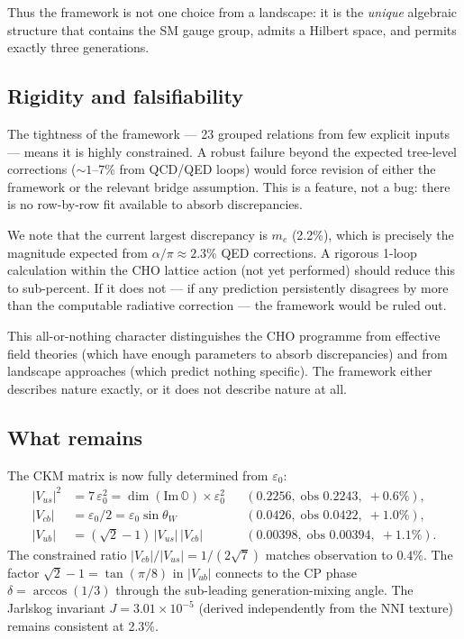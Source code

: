 \documentclass[12pt,a4paper]{article}
\theoremstyle{definition}
\theoremstyle{remark}
\newcommand{\Oct}{\mathbb{O}}
\begin{document}
Thus the framework is not one choice from a landscape: it is the \emph{unique} 
algebraic structure that contains the SM gauge group, admits a Hilbert space, 
and permits exactly three generations.

\subsection{Rigidity and falsifiability}

The tightness of the framework --- 23 grouped relations from few explicit inputs --- 
means it is highly constrained. A robust failure beyond the expected tree-level 
corrections ($\sim 1$--7\% from QCD/QED loops) would force revision of either 
the framework or the relevant bridge assumption. This is a feature, not a bug: 
there is no row-by-row fit available to absorb discrepancies.

We note that the current largest discrepancy is $m_e$ (2.2\%), which is 
precisely the magnitude expected from $\alpha/\pi \approx 2.3\%$ QED 
corrections. A rigorous 1-loop calculation within the CHO lattice action 
(not yet performed) should reduce this to sub-percent. If it does not --- 
if any prediction persistently disagrees by more than the computable 
radiative correction --- the framework would be ruled out.

This all-or-nothing character distinguishes the CHO programme from 
effective field theories (which have enough parameters to absorb 
discrepancies) and from landscape approaches (which predict nothing 
specific). The framework either describes nature exactly, or it does not 
describe nature at all.

\subsection{What remains}

The CKM matrix is now fully determined from $\varepsilon_0$:
\begin{align}
|V_{us}|^2 &= 7\,\varepsilon_0^2 = \dim(\mathrm{Im}\,\Oct) \times \varepsilon_0^2
  && (0.2256,\;\text{obs } 0.2243,\; +0.6\%), \nonumber\\
|V_{cb}| &= \varepsilon_0/2 = \varepsilon_0 \sin\theta_W
  && (0.0426,\;\text{obs } 0.0422,\; +1.0\%), \nonumber\\
|V_{ub}| &= (\sqrt{2}-1)\,|V_{us}|\,|V_{cb}|
  && (0.00398,\;\text{obs } 0.00394,\; +1.1\%).
\end{align}
The constrained ratio $|V_{cb}|/|V_{us}| = 1/(2\sqrt{7})$ matches observation 
to $0.4\%$. The factor $\sqrt{2}-1 = \tan(\pi/8)$ in $|V_{ub}|$ connects to the 
CP phase $\delta = \arccos(1/3)$ through the sub-leading generation-mixing angle.
The Jarlskog invariant $J = 3.01\times 10^{-5}$ (derived independently from the 
NNI texture) remains consistent at 2.3\%.
\end{document}
